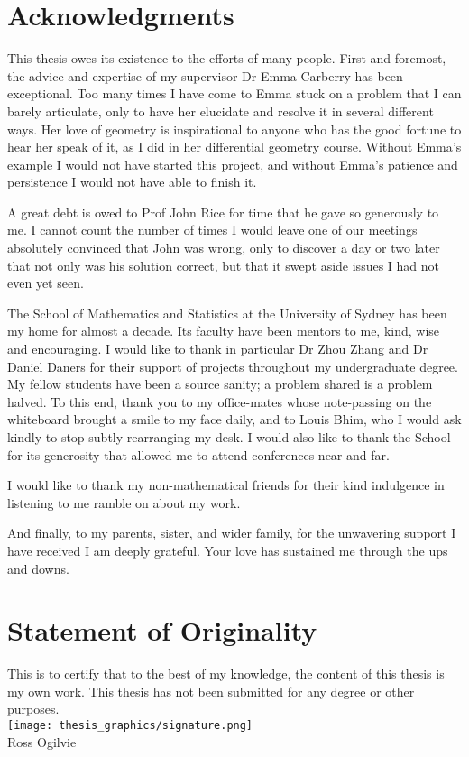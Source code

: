 
\section*{Acknowledgments}

This thesis owes its existence to the efforts of many people. First and foremost, the advice and expertise of my supervisor Dr Emma Carberry has been exceptional.
Too many times I have come to Emma stuck on a problem that I can barely articulate, only to have her elucidate and resolve it in several different ways.
Her love of geometry is inspirational to anyone who has the good fortune to hear her speak of it, as I did in her differential geometry course. Without Emma's example I would not have started this project, and without Emma's patience and persistence I would not have able to finish it.

A great debt is owed to Prof John Rice for time that he gave so generously to me. I cannot count the number of times I would leave one of our meetings absolutely convinced that John was wrong, only to discover a day or two later that not only was his solution correct, but that it swept aside issues I had not even yet seen.

The School of Mathematics and Statistics at the University of Sydney has been my home for almost a decade. Its faculty have been mentors to me, kind, wise and encouraging. I would like to thank in particular Dr Zhou Zhang and Dr Daniel Daners for their support of projects throughout my undergraduate degree.
My fellow students have been a source sanity; a problem shared is a problem halved.
To this end, thank you to my office-mates whose note-passing on the whiteboard brought a smile to my face daily, and to Louis Bhim, who I would ask kindly to stop subtly rearranging my desk.
I would also like to thank the School for its generosity that allowed me to attend conferences near and far.

I would like to thank my non-mathematical friends for their kind indulgence in listening to me ramble on about my work.

And finally, to my parents, sister, and wider family, for the unwavering support I have received I am deeply grateful. Your love has sustained me through the ups and downs.



\vfill
\section*{Statement of Originality}

This is to certify that to the best of my knowledge, the content of this thesis is my own work. This thesis has not been submitted for any degree or other purposes.
\\
\texttt{[image: thesis\_graphics/signature.png]}
\\
Ross Ogilvie
